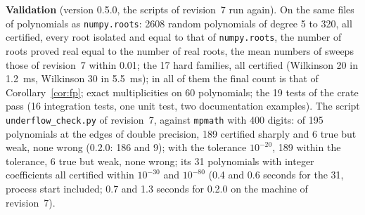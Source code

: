 \documentclass[10pt,a4paper]{article}
\theoremstyle{definition}
\numberwithin{equation}{section}
\begin{document}
\textbf{Validation} (version 0.5.0, the scripts of revision~7 run again). On the same files of
polynomials as \texttt{numpy.roots}: 2608 random polynomials of degree 5 to 320, all certified, every
root isolated and equal to that of \texttt{numpy.roots}, the number of roots proved real equal to the
number of real roots, the mean numbers of sweeps those of revision~7 within 0.01; the 17 hard families,
all certified (Wilkinson 20 in 1.2~ms, Wilkinson 30 in 5.5~ms); in all of them the final count is that
of Corollary~\ref{cor:fp}; exact multiplicities on 60 polynomials; the 19 tests of the crate pass (16
integration tests, one unit test, two documentation examples). The script \texttt{underflow\_check.py} of revision~7, against \texttt{mpmath} with 400 digits: of
195 polynomials at the edges of double precision, 189 certified sharply and 6 true but weak, none wrong
(0.2.0: 186 and 9); with the tolerance $10^{-20}$, 189 within the tolerance, 6 true but weak, none
wrong; its 31 polynomials with integer coefficients all certified within $10^{-30}$ and $10^{-80}$
(0.4 and 0.6 seconds for the 31, process start included; 0.7 and 1.3 seconds for 0.2.0 on the
machine of revision~7).
\end{document}

